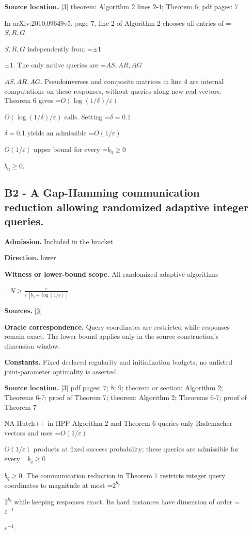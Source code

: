 \documentclass[10pt,a4paper]{article}
\newcommand{\AtlasMath}[1]{\par\begingroup\centering\setbox0=\hbox{$\displaystyle #1$}\ifdim\wd0>1.4\linewidth\typeout{ATLAS WIDE FORMULA: \the\wd0}\fi\ifdim\wd0>\linewidth\resizebox{\linewidth}{!}{\box0}\else\box0\fi\par\endgroup}
\newcommand{\AtlasInlineMath}[1]{\begingroup\setbox0=\hbox{$#1$}\ifdim\wd0>.4\linewidth\endgroup\AtlasMath{#1}\else\endgroup$#1$\fi}
\begin{document}
\textbf{Source location.} \href{https://arxiv.org/pdf/2010.09649v5}{[3]} theorem: Algorithm 2 lines 2-4; Theorem 6; pdf pages: 7

In arXiv:2010.09649v5, page 7, line 2 of Algorithm 2 chooses all entries of \AtlasInlineMath{S,R,G} independently from \AtlasInlineMath{\pm1}. The only native queries are \AtlasInlineMath{AS,AR,AG}. Pseudoinverses and composite matrices in line 4 are internal computations on these responses, without queries along new real vectors. Theorem 6 gives \AtlasInlineMath{O(\log(1/\delta)/\varepsilon)} calls. Setting \AtlasInlineMath{\delta=0.1} yields an admissible \AtlasInlineMath{O(1/\varepsilon)} upper bound for every \AtlasInlineMath{b_{\mathrm q}\ge0}.

\subsection{B2 - A Gap-Hamming communication reduction allowing randomized adaptive integer queries.}
\textbf{Admission.} Included in the bracket

\textbf{Direction.} lower

\textbf{Witness or lower-bound scope.} All randomized adaptive algorithms

\AtlasMath{N\ge\frac{c}{\varepsilon\,[b_{\mathrm{q}}+\log(1/\varepsilon)]}}
\textbf{Sources.} \href{https://arxiv.org/pdf/2010.09649v5}{[3]}

\textbf{Oracle correspondence.} Query coordinates are restricted while responses remain exact. The lower bound applies only in the source construction's dimension window.

\textbf{Constants.} Fixed declared regularity and initialization budgets; no unlisted joint-parameter optimality is asserted.

\textbf{Source location.} \href{https://arxiv.org/pdf/2010.09649v5}{[3]} pdf pages: 7; 8; 9; theorem or section: Algorithm 2; Theorems 6-7; proof of Theorem 7; theorem: Algorithm 2; Theorems 6-7; proof of Theorem 7

NA-Hutch++ in HPP Algorithm 2 and Theorem 6 queries only Rademacher vectors and uses \AtlasInlineMath{O(1/\varepsilon)} products at fixed success probability; these queries are admissible for every \AtlasInlineMath{b_q\ge0}. The communication reduction in Theorem 7 restricts integer query coordinates to magnitude at most \AtlasInlineMath{2^{b_q}} while keeping responses exact. Its hard instances have dimension of order \AtlasInlineMath{\varepsilon^{-1}}.
\end{document}
